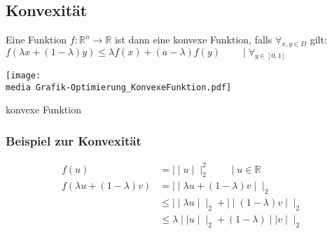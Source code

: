 \subsection{Konvexität}

\begin{Def}
Eine Funktion $f: \mathbb{R}^n\rightarrow\mathbb{R}$ ist dann eine konvexe Funktion, falls $\forall_{x,y\in D}$ gilt: 
$f(\lambda x+ (1 - \lambda)y) \leq \lambda f(x)+(a-\lambda)f(y) \qquad \mid \forall_{y\in[0,1]}$

\begin{dsafigure}
\begin{center}
\texttt{[image: \\media Grafik-Optimierung\_KonvexeFunktion.pdf]}
\caption{konvexe Funktion}
\end{center}
\end{dsafigure}

\end{Def}

\subsubsection{Beispiel zur Konvexität}

\begin{align*}
f(u) &=\mid\mid u\mid\mid_2^2\qquad\mid u\in\mathbb{R}\\
f(\lambda u+(1-\lambda)v) &=\mid\mid\lambda u+(1-\lambda)v\mid\mid_2 \\
&\leq\mid\mid\lambda u\mid\mid_2+\mid\mid(1-\lambda)v\mid\mid_2 \\
&\leq\lambda\mid\mid u\mid\mid_2+(1-\lambda)\mid\mid v\mid\mid_2
\end{align*}